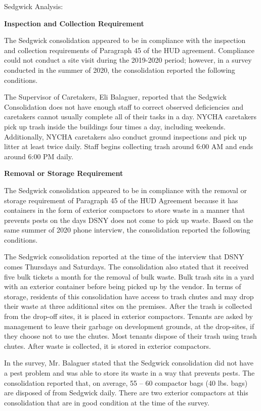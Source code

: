 Sedgwick Analysis: 

\textbf{Inspection and Collection Requirement} 

 

The Sedgwick consolidation appeared to be in compliance with the inspection and collection requirements of Paragraph 45 of the HUD agreement. Compliance could not conduct a site visit during the 2019-2020 period; however, in a survey conducted in the summer of 2020, the consolidation reported the following conditions.

The Supervisor of Caretakers, Eli Balaguer, reported that the Sedgwick Consolidation does not have enough staff to correct observed deficiencies and caretakers cannot usually complete all of their tasks in a day. NYCHA caretakers pick up trash inside the buildings four times a day, including weekends. Additionally, NYCHA caretakers also conduct ground inspections and pick up litter at least twice daily. Staff begins collecting trash around 6:00 AM and ends around 6:00 PM daily. 

 

\textbf{Removal or Storage Requirement} 

The Sedgwick consolidation appeared to be in compliance with the removal or storage requirement of Paragraph  45 of the HUD Agreement because it has containers in the form of exterior compactors to store waste in a manner that prevents pests on the days DSNY does not come to pick up waste. Based on the same summer of  2020 phone interview, the consolidation reported the following conditions.

  

The Sedgwick consolidation reported at the time of the interview that DSNY comes Thursdays and Saturdays. The consolidation also stated that it received five bulk tickets a month for the removal of bulk waste. Bulk trash sits in a yard with an exterior container before being picked up by the vendor.  In terms of storage, residents of this consolidation have access to trash chutes and may drop their waste at three additional sites on the premises. After the trash is collected from the drop-off sites, it is placed in exterior compactors. Tenants are asked by management to leave their garbage on development grounds, at the drop-sites, if they choose not to use the chutes. Most tenants dispose of their trash using trash chutes. After waste is collected, it is stored in exterior compactors.

 

In the survey, Mr. Balaguer stated that the Sedgwick consolidation did not have a pest problem and was able to store its waste in a way that prevents pests. The consolidation reported that, on average, 55 -- 60 compactor bags (40 lbs. bags) are disposed of from Sedgwick daily. There are two exterior compactors at this consolidation that are in good condition at the time of the survey.

